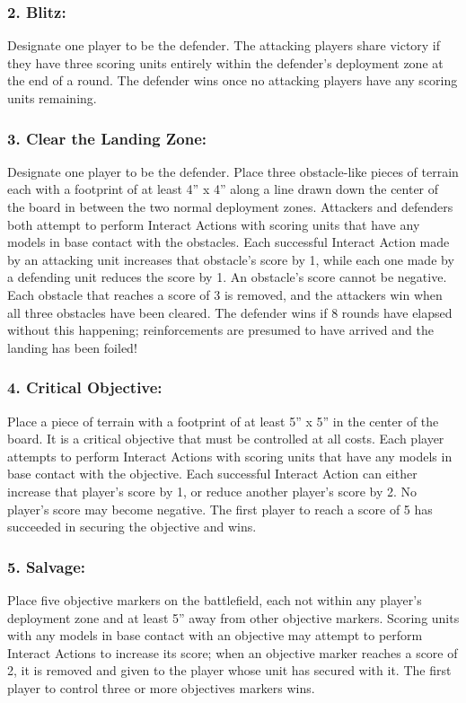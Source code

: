 \begin{multicols}{2}
\subsubsection*{2. Blitz:} Designate one player to be the defender. The attacking players share victory if they have three scoring units entirely within the defender's deployment zone at the end of a round. The defender wins once no attacking players have any scoring units remaining.

\subsubsection*{3. Clear the Landing Zone:} Designate one player to be the defender. Place three obstacle-like pieces of terrain each with a footprint of at least 4'' x 4'' along a line drawn down the center of the board in between the two normal deployment zones. Attackers and defenders both attempt to perform Interact Actions with scoring units that have any models in base contact with the obstacles. Each successful Interact Action made by an attacking unit increases that obstacle's score by 1, while each one made by a defending unit reduces the score by 1. An obstacle's score cannot be negative. Each obstacle that reaches a score of 3 is removed, and the attackers win when all three obstacles have been cleared. The defender wins if 8 rounds have elapsed without this happening; reinforcements are presumed to have arrived and the landing has been foiled!

\subsubsection*{4. Critical Objective:} Place a piece of terrain with a footprint of at least 5'' x 5'' in the center of the board. It is a critical objective that must be controlled at all costs. Each player attempts to perform Interact Actions with scoring units that have any models in base contact with the objective. Each successful Interact Action can either increase that player's score by 1, or reduce another player's score by 2. No player's score may become negative. The first player to reach a score of 5 has succeeded in securing the objective and wins.

\subsubsection*{5. Salvage:} Place five objective markers on the battlefield, each not within any player's deployment zone and at least 5'' away from other objective markers. Scoring units with any models in base contact with an objective may attempt to perform Interact Actions to increase its score; when an objective marker reaches a score of 2, it is removed and given to the player whose unit has secured with it. The first player to control three or more objectives markers wins.


\end{multicols}
